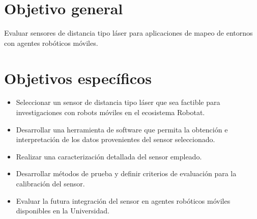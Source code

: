 \section{Objetivo general}
Evaluar sensores de distancia tipo láser para aplicaciones de mapeo de entornos con agentes robóticos móviles.

\section{Objetivos específicos}
\begin{itemize}
	\item  Seleccionar un sensor de distancia tipo láser que sea factible para investigaciones con robots móviles en el ecosistema Robotat.
	\item Desarrollar una herramienta de software que permita la obtención e interpretación de los datos provenientes del sensor seleccionado.
	\item Realizar una caracterización detallada del sensor empleado. 
	\item Desarrollar métodos de prueba y definir criterios de evaluación para la calibración del sensor.
	\item Evaluar la futura integración del sensor en agentes robóticos móviles disponibles en la Universidad.
\end{itemize}